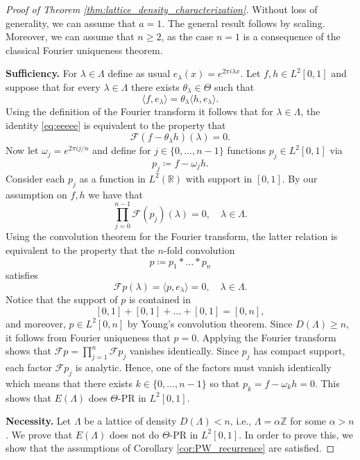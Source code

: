 \documentclass[reqno,a4paper,11pt]{amsart}
\numberwithin{equation}{section}
\def\Z{{\mathbb Z}}
\def\R{{\mathbb R}}
\newcommand\1{\mathds{1}}
\newcommand{\ft}{{\mathcal{F}}}
\begin{document}
\begin{proof}[Proof of Theorem \ref{thm:lattice_density_characterization}]
Without loss of generality, we can assume that $a=1$. The general result follows by scaling. Moreover, we can assume that $n \geq 2$, as the case $n=1$ is a consequence of the classical Fourier uniqueness theorem.

\textbf{Sufficiency.}
For $\lambda \in \Lambda$ define as usual $e_\lambda(x) = e^{2\pi i \lambda x}$. Let $f,h \in L^2[0,1]$ and suppose that for every $\lambda \in \Lambda$ there exists $\theta_\lambda \in \Theta$ such that
\begin{equation}\label{eq:eeeee}
    \langle f,e_\lambda \rangle = \theta_\lambda \langle h,e_\lambda \rangle.
\end{equation}
Using the definition of the Fourier transform it follows that for $\lambda \in \Lambda$, the identity \eqref{eq:eeeee} is equivalent to the property that
$$
\ft(f-\theta_\lambda h)(\lambda) =0.
$$
Now let $\omega_j=e^{2\pi i j/n}$ and define for $j \in \{ 0, \dots, n-1 \}$ functions $p_j \in L^2[0,1]$ via
\begin{equation}\label{eq:prod_analytic}
        p_j \coloneqq  f - \omega_j h.
    \end{equation}
Consider each $p_j$ as a function in $L^2(\R)$ with support in $[0,1]$. By our assumption on $f,h$ we have that
$$
\prod_{j=0}^{n-1} \ft(p_j)(\lambda) = 0, \quad \lambda \in \Lambda.
$$
Using the convolution theorem for the Fourier transform, the latter relation is equivalent to the property that the $n$-fold convolution
$$
p \coloneqq p_1 * \dots * p_n
$$
satisfies
$$
\ft p(\lambda) = \langle p, e_\lambda \rangle =0, \quad \lambda \in \Lambda.
$$
Notice that the support of $p$ is contained in
$$
[0,1] + [0,1] + \dots + [0,1] = [0,n],
$$
and moreover, $p \in L^2[0,n]$ by Young's convolution theorem. Since $D(\Lambda) \geq n$, it follows from Fourier uniqueness that $p=0$. Applying the Fourier transform shows that
$
\ft p = \prod_{j=1}^n \ft p_j
$
vanishes identically. Since $p_j$ has compact support, each factor $\ft p_j$ is analytic. Hence, one of the factors must vanish identically which means that there exists $k \in \{0, \dots, n-1 \}$ so that $p_k = f- \omega_k h =0$. This shows that $E(\Lambda)$ does $\Theta$-PR in $L^2[0,1]$.

\textbf{Necessity.}
    Let $\Lambda$ be a lattice of density $D(\Lambda) < n$, i.e., $\Lambda = \alpha \Z$ for some $\alpha > n$. We prove that $E(\Lambda)$ does not do $\Theta$-PR in $L^2[0,1]$. In order to prove this, we show that the assumptions of Corollary \ref{cor:PW_recurrence} are satisfied.
    

\end{proof}
\end{document}
